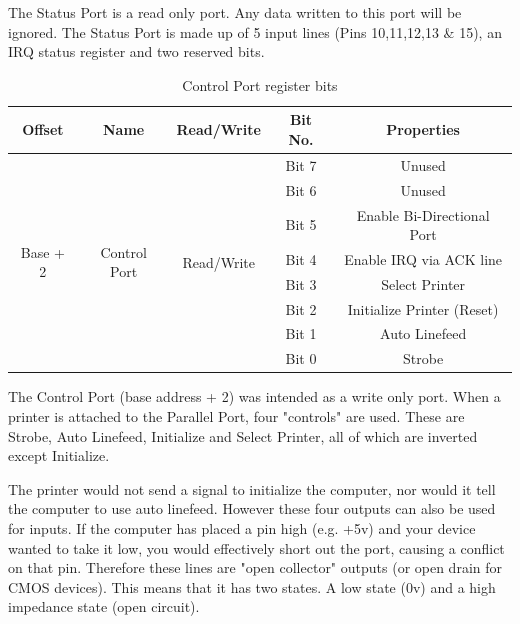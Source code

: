 \documentclass[a4paper,28pt]{report}
\begin{document}
The Status Port is a read only port. Any data written to this port will be ignored. The Status Port is made up of 5 input lines (Pins 10,11,12,13 \& 15), an IRQ status register and two reserved bits.
\begin{table}[]
\centering
\bgroup
\def\arraystretch{1.5}
\begin{tabular}{|c|c|c|c|c|}
\hline
\textbf{Offset}           & \textbf{Name}                 & \textbf{Read/Write}         & \textbf{Bit No.} & \textbf{Properties}        \\ \hline
\multirow{8}{*}{Base + 2} & \multirow{8}{*}{Control Port} & \multirow{8}{*}{Read/Write} & Bit 7            & Unused                     \\ \cline{4-5} 
                          &                               &                             & Bit 6            & Unused                     \\ \cline{4-5} 
                          &                               &                             & Bit 5            & Enable Bi-Directional Port \\ \cline{4-5} 
                          &                               &                             & Bit 4            & Enable IRQ via ACK line    \\ \cline{4-5} 
                          &                               &                             & Bit 3            & Select Printer             \\ \cline{4-5} 
                          &                               &                             & Bit 2            & Initialize Printer (Reset) \\ \cline{4-5} 
                          &                               &                             & Bit 1            & Auto Linefeed              \\ \cline{4-5} 
                          &                               &                             & Bit 0            & Strobe                     \\ \hline
\end{tabular}
\caption{Control Port register bits}
\egroup
\end{table}

The Control Port (base address + 2) was intended as a write only port. When a printer is attached to the Parallel Port, four "controls" are used. These are Strobe, Auto Linefeed, Initialize and Select Printer, all of which are inverted
except Initialize.

The printer would not send a signal to initialize the computer, nor would it tell the computer to use auto linefeed. However these four outputs can also be used for inputs. If the computer has placed a pin high (e.g. +5v) and your device wanted to take it low, you would effectively short out the port, causing a conflict on that pin. Therefore these lines are "open collector" outputs (or open drain for CMOS devices). This means that it has two states. A low state (0v) and a high impedance state (open circuit).
\end{document}
